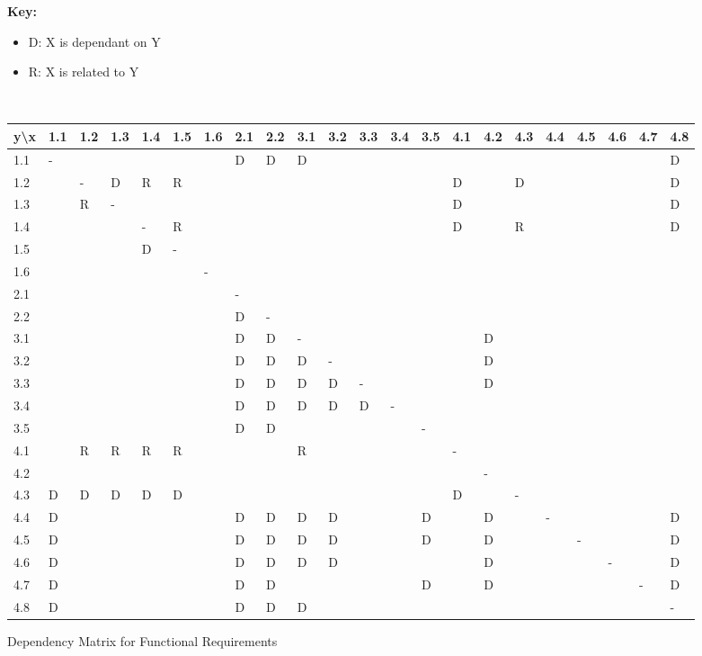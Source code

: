 \documentclass[10pt, notitlepage]{report}
\begin{document}
\begin{figure}[h]
	\textbf{Key:}
	\begin{itemize}
	\item D: X is dependant on Y
	\item R: X is related to Y
	\end{itemize}

	\leavevmode \\
	
	\centering


	\begin{tabular}{p{0.4cm}| p{0.3cm} p{0.3cm} p{0.3cm} p{0.3cm} p{0.3cm} p{0.3cm} p{0.3cm} p{0.3cm} p{0.3cm} p{0.3cm} p{0.3cm} p{0.3cm} p{0.3cm} p{0.3cm} p{0.3cm} p{0.3cm} p{0.3cm} p{0.3cm} p{0.3cm} p{0.3cm} p{0.3cm}}

	y\textbackslash x&1.1&1.2&1.3&1.4&1.5&1.6&2.1&2.2&3.1&3.2&3.3&3.4&3.5&4.1&4.2&4.3&4.4&4.5&4.6&4.7&4.8\\ \hline
	1.1&-&&&&&&D&D&D&&&&&&&&&&&&D\\
	1.2&&-&D&R&R&&&&&&&&&D&&D&&&&&D\\
	1.3&&R&-&&&&&&&&&&&D&&&&&&&D\\
	1.4&&&&-&R&&&&&&&&&D&&R&&&&&D\\
	1.5&&&&D&-&&&&&&&&&&&&&&&&\\
	1.6&&&&&&-&&&&&&&&&&&&&&&\\
	2.1&&&&&&&-&&&&&&&&&&&&&&\\
	2.2&&&&&&&D&-&&&&&&&&&&&&&\\
	3.1&&&&&&&D&D&-&&&&&&D&&&&&&\\
	3.2&&&&&&&D&D&D&-&&&&&D&&&&&&\\
	3.3&&&&&&&D&D&D&D&-&&&&D&&&&&&\\
	3.4&&&&&&&D&D&D&D&D&-&&&&&&&&&\\
	3.5&&&&&&&D&D&&&&&-&&&&&&&&\\
	4.1&&R&R&R&R&&&&R&&&&&-&&&&&&&\\
	4.2&&&&&&&&&&&&&&&-&&&&&&\\
	4.3&D&D&D&D&D&&&&&&&&&D&&-&&&&&\\
	4.4&D&&&&&&D&D&D&D&&&D&&D&&-&&&&D\\
	4.5&D&&&&&&D&D&D&D&&&D&&D&&&-&&&D\\
	4.6&D&&&&&&D&D&D&D&&&&&D&&&&-&&D\\
	4.7&D&&&&&&D&D&&&&&D&&D&&&&&-&D\\
	4.8&D&&&&&&D&D&D&&&&&&&&&&&&-\\
	\end{tabular}

	\caption{Dependency Matrix for Functional Requirements}
	\label{fig:depmat}
\end{figure}
\end{document}

